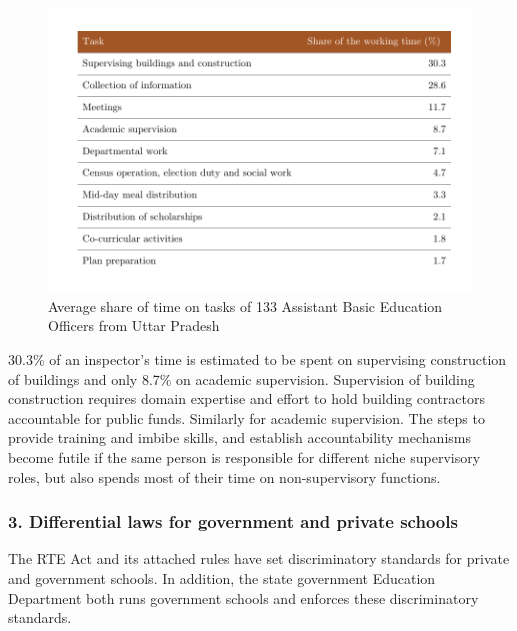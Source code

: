 \documentclass[a4paper, 12pt, twoside]{article}
\begin{document}
\begin{figure}[H]
 \centering
\includegraphics[page=1, width = 16cm]{figure3}
\caption{Average share of time on tasks of 133 Assistant Basic Education Officers from Uttar Pradesh}
\end{figure}

30.3\% of an inspector’s time is estimated to be spent on supervising construction of buildings and only 8.7\% on academic supervision. Supervision of building construction requires domain expertise and effort to hold building contractors accountable for public funds. Similarly for  academic supervision. The steps to provide training and imbibe skills, and establish accountability mechanisms become futile if the same person is responsible for different niche supervisory roles, but also spends most of their time on non-supervisory functions.

\subsubsection*{3. Differential laws for government and private schools}

The RTE Act and its attached rules have set discriminatory standards for private and government schools. In addition, the state government Education Department both runs government schools and enforces these discriminatory standards.
\end{document}
